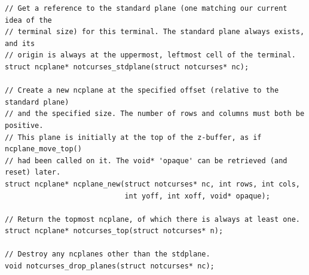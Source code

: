 \documentclass[letterpaper,10pt]{article}
\begin{document}
\begin{listing}[!htbp]
\begin{verbatim}
// Get a reference to the standard plane (one matching our current idea of the
// terminal size) for this terminal. The standard plane always exists, and its
// origin is always at the uppermost, leftmost cell of the terminal.
struct ncplane* notcurses_stdplane(struct notcurses* nc);

// Create a new ncplane at the specified offset (relative to the standard plane)
// and the specified size. The number of rows and columns must both be positive.
// This plane is initially at the top of the z-buffer, as if ncplane_move_top()
// had been called on it. The void* 'opaque' can be retrieved (and reset) later.
struct ncplane* ncplane_new(struct notcurses* nc, int rows, int cols,
                            int yoff, int xoff, void* opaque);

// Return the topmost ncplane, of which there is always at least one.
struct ncplane* notcurses_top(struct notcurses* n);

// Destroy any ncplanes other than the stdplane.
void notcurses_drop_planes(struct notcurses* nc);
\end{verbatim}
\end{listing}
\end{document}
